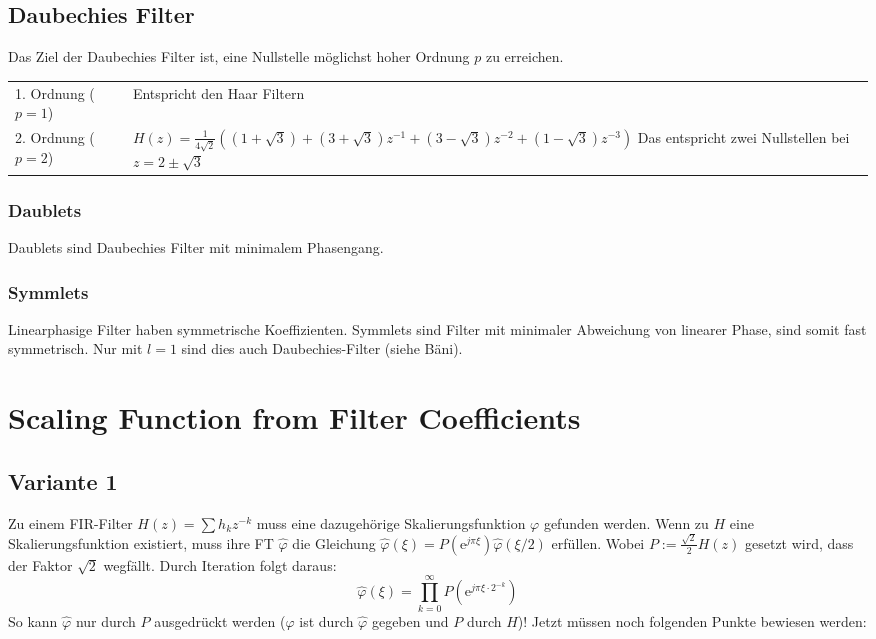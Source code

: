 \subsection{Daubechies Filter }
  Das Ziel der Daubechies Filter ist, eine Nullstelle möglichst hoher Ordnung $p$ zu erreichen.
  
  \begin{tabularx}{\textwidth}{p{5cm} X}
    1. Ordnung ($p=1$)
      & Entspricht den Haar Filtern\\
    2. Ordnung ($p=2$)
      & $H(z) = \frac{1}{4\sqrt{2}} \left( (1+\sqrt{3}) + (3+\sqrt{3})z^{-1} + (3-\sqrt{3})z^{-2} + (1-\sqrt{3})z^{-3} \right)$
      Das entspricht zwei Nullstellen bei $z= 2 \pm \sqrt{3}$\\
  \end{tabularx}
  
\subsubsection{Daublets }
  Daublets sind Daubechies Filter mit minimalem Phasengang.

\subsubsection{Symmlets }
  Linearphasige Filter haben symmetrische Koeffizienten. Symmlets sind Filter mit minimaler Abweichung von linearer Phase, sind somit fast symmetrisch. Nur mit $l=1$ sind dies auch Daubechies-Filter (siehe Bäni).


\section{Scaling Function from Filter Coefficients}

\subsection{Variante 1}
Zu einem FIR-Filter $H(z)=\sum h_k z^{-k}$ muss eine dazugehörige Skalierungsfunktion $\varphi$ gefunden werden.
Wenn zu $H$ eine Skalierungsfunktion existiert, muss ihre FT $\hat{\varphi}$ die Gleichung $\hat{\varphi}(\xi)=P(\mathrm{e}^{j\pi\xi})\hat{\varphi}(\xi/2)$ erfüllen. Wobei $P:=\frac{\sqrt{2}}{2}H(z)$ gesetzt wird, dass der Faktor $\sqrt{2}$ wegfällt. Durch Iteration folgt daraus:
\[ \hat{\varphi}(\xi) = \prod_{k=0}^{\infty}P(\mathrm{e}^{j\pi\xi\cdot 2^{-k}}) \]
So kann $\hat{\varphi}$ nur durch $P$ ausgedrückt werden ($\varphi$ ist durch $\hat{\varphi}$ gegeben und $P$ durch $H$)!
Jetzt müssen noch folgenden Punkte bewiesen werden:

